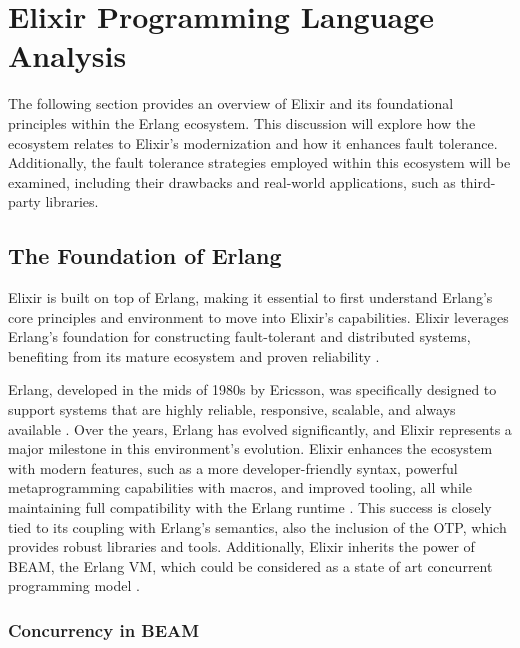 \section{Elixir Programming Language Analysis}

The following section provides an overview of Elixir and its foundational principles within the Erlang ecosystem. This discussion will explore how the ecosystem relates to Elixir's modernization and how it enhances fault tolerance. Additionally, the fault tolerance strategies employed within this ecosystem will be examined, including their drawbacks and real-world applications, such as third-party libraries.

\subsection{The Foundation of Erlang}

Elixir is built on top of Erlang, making it essential to first understand Erlang’s core principles and environment to move into Elixir’s capabilities. Elixir leverages Erlang’s foundation for constructing fault-tolerant and distributed systems, benefiting from its mature ecosystem and proven reliability \cite{Juric2024,Armstrong2013}.

Erlang, developed in the mids of 1980s by Ericsson, was specifically designed to support systems that are highly reliable, responsive, scalable, and always available \cite{Armstrong2013,Juric2024}. Over the years, Erlang has evolved significantly, and Elixir represents a major milestone in this environment's evolution. Elixir enhances the ecosystem with modern features, such as a more developer-friendly syntax, powerful metaprogramming capabilities with macros, and improved tooling, all while maintaining full compatibility with the Erlang runtime \cite{Juric2024,elixir-docs-hexdocs}. This success is closely tied to its coupling with Erlang’s semantics, also the inclusion of the \gls{OTP}, which provides robust libraries and tools. Additionally, Elixir inherits the power of \gls{BEAM}, the Erlang \gls{VM}, which could be considered as a state of art concurrent programming model \cite{erlang-concurrency-blog}.

\subsubsection{Concurrency in BEAM}

